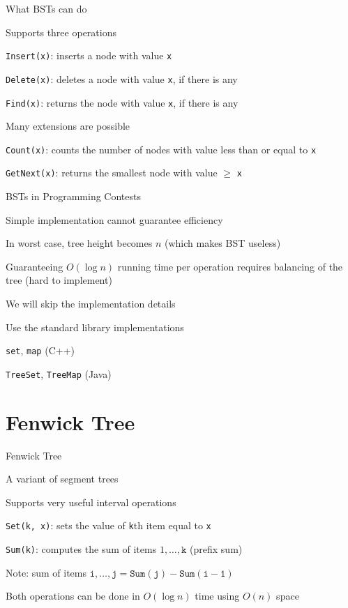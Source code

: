\documentclass[13pt,onlymath]{beamer}
\begin{document}
\begin{frame}[fragile]{What BSTs can do}
\BIT
\item Supports three operations
\BIT
\item \verb,Insert(x),: inserts a node with value \verb,x,
\item \verb,Delete(x),: deletes a node with value \verb,x,, if there is any
\item \verb,Find(x),: returns the node with value \verb,x,, if there is any
\EIT
\item Many extensions are possible
\BIT
\item \verb,Count(x),: counts the number of nodes with value less than or equal to \verb,x,
\item \verb,GetNext(x),: returns the smallest node with value $\ge$ \verb,x,
\EIT
\EIT
\end{frame}

\begin{frame}[fragile]{BSTs in Programming Contests}
\BIT
\item Simple implementation cannot guarantee efficiency
\BIT
\item In worst case, tree height becomes $n$ (which makes BST useless)
\item Guaranteeing $O(\log n)$ running time per operation requires balancing of the tree (hard to implement)
\item We will skip the implementation details
\EIT
\item Use the standard library implementations
\BIT
\item \verb,set,, \verb,map, (C++)
\item \verb,TreeSet,, \verb,TreeMap, (Java)
\EIT
\EIT
\end{frame}

\section{Fenwick Tree}

\begin{frame}[fragile]{Fenwick Tree}
\BIT
\item A variant of segment trees
\item Supports very useful interval operations
\BIT
\item \verb.Set(k, x).: sets the value of \verb.k.th item equal to \verb.x.
\item \verb.Sum(k).: computes the sum of items $1, \ldots, \mathtt{k}$ (prefix sum)
\BIT
\item Note: sum of items $\mathtt{i}, \ldots, \mathtt{j} = \mathtt{Sum(j)} - \mathtt{Sum(i - 1)}$
\EIT
\EIT
\item Both operations can be done in $O(\log n)$ time using $O(n)$ space
\EIT
\end{frame}
\end{document}
